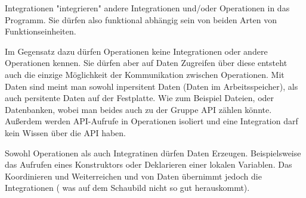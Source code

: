\documentclass[11pt]{article}
\begin{document}
Integrationen "integrieren" andere Integrationen und/oder Operationen in das Programm. Sie dürfen also funktional abhängig sein
von beiden Arten von Funktionseinheiten.

Im Gegensatz dazu dürfen Operationen keine Integrationen oder andere Operationen kennen. 
Sie dürfen aber auf Daten Zugreifen über diese entsteht auch die einzige Möglichkeit der Kommunikation zwischen Operationen.
Mit Daten sind meint man sowohl inpersitent Daten (Daten im Arbeitsspeicher), als auch persitente Daten auf der Festplatte.
Wie zum Beispiel Dateien, oder Datenbanken, wobei man beides auch zu der Gruppe API zählen könnte. 
Außerdem werden API-Aufrufe in Operationen isoliert und eine Integration darf kein Wissen über die API haben.

Sowohl Operationen als auch Integratinen dürfen Daten Erzeugen.
Beispielsweise das Aufrufen eines Konstruktors oder Deklarieren einer lokalen Variablen.
Das Koordinieren und Weiterreichen und von Daten übernimmt jedoch die Integrationen ( was auf dem Schaubild nicht so
gut herauskommt).
\end{document}
